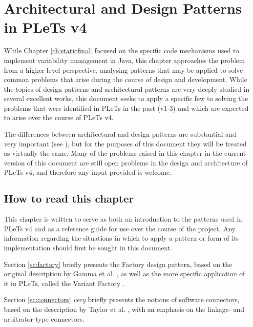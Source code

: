 \chapter{Architectural and Design Patterns in PLeTs v4}
\label{ch:patterns}

While Chapter \ref{ch:staticfinal} focused on the specific code mechanisms used to implement variability management in Java, this chapter approaches the problem from a higher-level perspective, analysing patterns that may be applied to solve common problems that arise during the course of design and development. While the topics of design patterns \cite{GAMMA:1995} and architectural patterns \cite{TAYLOR:2009} are very deeply studied in several excellent works, this document seeks to apply a specific few to solving the problems that were identified in PLeTs in the past (v1-3) and which are expected to arise over the course of PLeTs v4.

The differences between architectural and design patterns are substantial and very important (see \cite{TAYLOR:2009}), but for the purposes of this document they will be treated as virtually the same. Many of the problems raised in this chapter in the current version of this document are still open problems in the design and architecture of PLeTs v4, and therefore any input provided is welcome.


\section*{How to read this chapter}

This chapter is written to serve as both an introduction to the patterns used in PLeTs v4 and as a reference guide for use over the course of the project. Any information regarding the situations in which to apply a pattern or form of its implementation should first be sought in this document.

Section \ref{sc:factory} briefly presents the Factory design pattern, based on the original description by Gamma et al. \cite{GAMMA:1995}, as well as the more specific application of it in PLeTs, called the Variant Factory \cite{LASER:2015}.

Section \ref{sc:connectors} \emph{very} briefly presents the notions of software \gls{connector}s, based on the description by Taylor et al. \cite{TAYLOR:2009}, with an emphasis on the linkage- and arbitrator-type \gls{connector}s.


